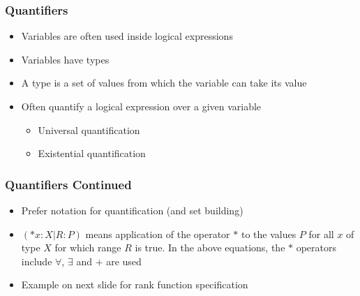 \documentclass[t,12pt,numbers,fleqn]{beamer}
\begin{document}

\begin{frame}
\frametitle{Quantifiers}
\begin{itemize}
\item Variables are often used inside logical expressions
\item Variables have types
\item A type is a set of values from which the variable can take its value
\item Often quantify a logical expression over a given variable
\begin{itemize}
\item Universal quantification
\item Existential quantification
\end{itemize}
\end{itemize}
\end{frame}


\begin{frame}
\frametitle{Quantifiers Continued}

\begin{itemize}
\item Prefer \cite[p.\ 143]{GriesAndSchneider1993} notation for quantification
  (and set building)
\item $(*x: X | R : P)$ means application of the operator $*$ to the values $P$ for
all $x$ of type $X$ for which range $R$ is true.  In the above equations, the
$*$ operators include $\forall$, $\exists$ and $+$ are used
\item Example on next slide for rank function specification
\end{itemize}

\end{frame}

\end{document}
